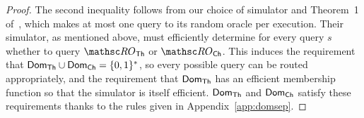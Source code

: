 \begin{proof}
	The second inequality follows from our choice of simulator and Theorem~1 of~\cite{EC:BelDavGun20}, which makes at most one query to its random oracle per execution.
	Their simulator, as mentioned above, must efficiently determine for every query $s$ whether to query $\ROthash$ or $\ROchash$. 
	This induces the requirement that $\mathsf{Dom}_{\mathsf{Th}} \cup \mathsf{Dom}_{\mathsf{Ch}} = \{0,1\}^*$, so every possible query can be routed appropriately, and the requirement that $\mathsf{Dom}_{\mathsf{Th}}$ has an efficient membership function so that the simulator is itself efficient.
	$\mathsf{Dom}_{\mathsf{Th}}$ and $\mathsf{Dom}_{\mathsf{Ch}}$ satisfy these requirements thanks to the rules given in Appendix~\ref{app:domsep}.
\end{proof}


